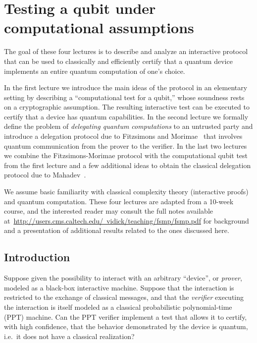 \chapter{Testing a qubit under computational assumptions}
\label{chap:computational-test}

The goal of these four lectures is to describe and analyze an interactive protocol that can be used to classically and efficiently certify  that a quantum device implements an entire quantum computation of one's choice. 

In the first lecture we introduce the main ideas of the protocol in an elementary setting by describing a ``computational test for a qubit,'' whose soundness rests on a cryptographic assumption. The resulting interactive test can be executed to certify that a device has quantum capabilities. 
In the second lecture we formally define the problem of \emph{delegating quantum computations} to an untrusted party and introduce a delegation protocol due to Fitzsimons and Morimae~\cite{morimae2016post} that involves quantum communication from the prover to the verifier. 
In the last two lectures we combine the Fitzsimons-Morimae protocol with the computational qubit test from the first lecture and a few additional ideas to obtain the classical delegation protocol due to Mahadev~\cite{mahadev2018classical}.  

\medskip

We assume basic familiarity with classical complexity theory (interactive proofs) and quantum computation. These four lectures are adapted from a 10-week course, and the interested reader may consult the full notes available at~\href{http://users.cms.caltech.edu/\~{}vidick/teaching/fsmp/fsmp.pdf}{http://users.cms.caltech.edu/~vidick/teaching/fsmp/fsmp.pdf} for background and a presentation of additional results related to the ones discussed here.

\section{Introduction}

Suppose given the possibility to interact with an arbitrary ``device'', or \emph{prover}, modeled as a black-box interactive machine. Suppose that the interaction is restricted to the exchange of classical messages, and that the \emph{verifier} executing the interaction is itself modeled as a classical probabilistic polynomial-time (PPT) machine. Can the PPT verifier implement a test that allows it to certify, with high confidence, that the behavior demonstrated by the device is quantum, i.e.\ it does not have a classical realization? 

